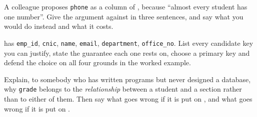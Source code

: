 \begin{checkpoint}
\begin{tightnum}
  \item A colleague proposes \texttt{phone} as a column of ,
        because ``almost every student has one number''. Give the argument
        against in three sentences, and say what you would do instead and what
        it costs.
  \item {} has \texttt{emp\_id}, \texttt{cnic}, \texttt{name},
        \texttt{email}, \texttt{department}, \texttt{office\_no}. List every
        candidate key you can justify, state the guarantee each one rests on,
        choose a primary key and defend the choice on all four grounds in the
        worked example.
  \item Explain, to somebody who has written programs but never designed a
        database, why \texttt{grade} belongs to the \emph{relationship} between
        a student and a section rather than to either of them. Then say what
        goes wrong if it is put on , and what goes wrong if it
        is put on .
\end{tightnum}
\end{checkpoint}

